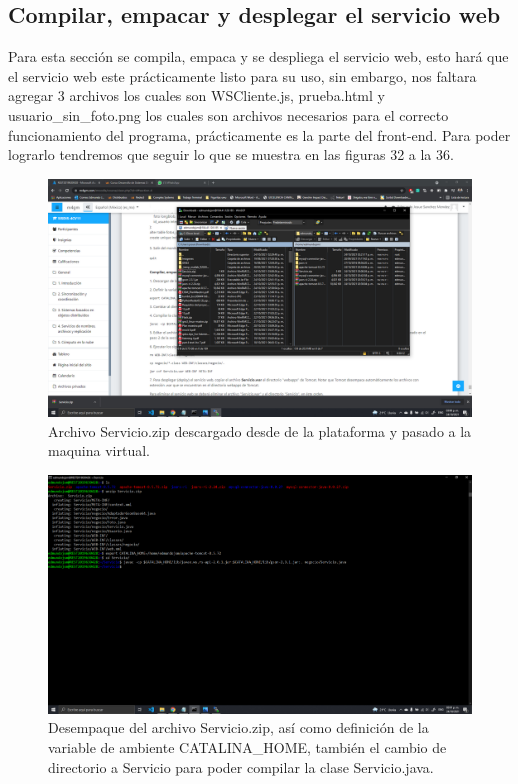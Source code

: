 \documentclass[11pt]{article}
\begin{document}
		\subsection{Compilar, empacar y desplegar el servicio web}
		Para esta sección se compila, empaca y se despliega el servicio web, esto hará que el servicio web este prácticamente listo para su uso, sin embargo, nos faltara agregar 3 archivos los cuales son WSCliente.js, prueba.html y usuario\_sin\_foto.png los cuales son archivos necesarios para el correcto funcionamiento del programa, prácticamente es la parte del front-end. Para poder lograrlo tendremos que seguir lo que se muestra en las figuras 32 a la 36.
		\begin{figure}[H]
			\centering
			\includegraphics[scale=0.34]{resources/cdb1.png}
			\caption{Archivo Servicio.zip descargado desde de la plataforma y pasado a la maquina virtual.}\label{fig:picture}
		\end{figure}
		\begin{figure}[H]
			\centering
			\includegraphics[scale=0.34]{resources/ced1234.png}
			\caption{Desempaque del archivo Servicio.zip, así como definición de la variable de ambiente CATALINA\_HOME, también el cambio de directorio a Servicio para poder compilar la clase Servicio.java.}\label{fig:picture}
		\end{figure}
\end{document}
